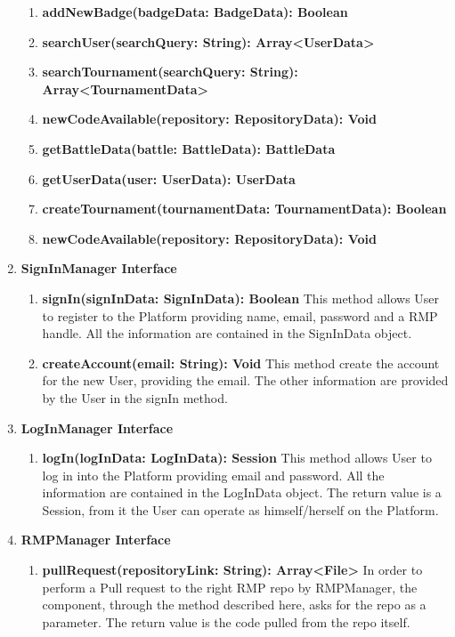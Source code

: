 \begin{enumerate}
\begin{enumerate}[label=$\bullet$]
                \item \textbf{addNewBadge(badgeData: BadgeData): Boolean}
                \item \textbf{searchUser(searchQuery: String): Array<UserData>}
                \item \textbf{searchTournament(searchQuery: String): Array<TournamentData>}
                \item \textbf{newCodeAvailable(repository: RepositoryData): Void}
                \item \textbf{getBattleData(battle: BattleData): BattleData}
                \item \textbf{getUserData(user: UserData): UserData}
                \item \textbf{createTournament(tournamentData: TournamentData): Boolean}
                \item \textbf{newCodeAvailable(repository: RepositoryData): Void}
            \end{enumerate}
    \item \textbf{SignInManager Interface} 
            \begin{enumerate}[label=$\bullet$]
                \item \textbf{signIn(signInData: SignInData): Boolean} This method allows User to register to the Platform providing name, email, password and a RMP handle. All the information are contained in the SignInData object.
                \item \textbf{createAccount(email: String): Void} This method create the account for the new User, providing the email. The other information are provided by the User in the signIn method.
            \end{enumerate}
    \item \textbf{LogInManager Interface}
        \begin{enumerate}[label=$\bullet$]
            \item \textbf{logIn(logInData: LogInData): Session} This method allows User to log in into the Platform providing email and password. All the information are contained in the LogInData object. The return value is a Session,
            from it the User can operate as himself/herself on the Platform.
        \end{enumerate}
    \item \textbf{RMPManager Interface}
        \begin{enumerate}[label=$\bullet$]
            \item \textbf{pullRequest(repositoryLink: String): Array<File>} In order to perform a Pull request to the right RMP repo by RMPManager, the component, through the method described here, asks for the repo as a parameter. The return value is the code pulled from the repo itself.

\end{enumerate}
\end{enumerate}
